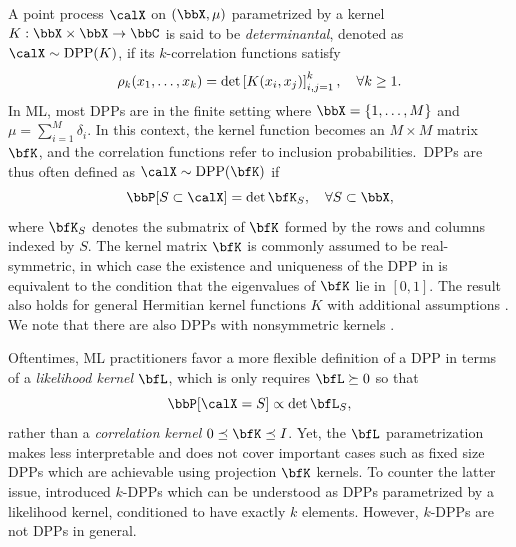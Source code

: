 \documentclass[twoside,11pt]{article}
\begin{document}

        A point process $\calX$ on $(\bbX,\mu)$ parametrized by a kernel $K:\bbX\times \bbX\rightarrow \bbC$ is said to be \emph{determinantal}, denoted as $\calX\sim\DPP(K)$, if its $k$-correlation functions satisfy
        \begin{equation*}
            \label{eq:k-correlation_function_DPP}
            \rho_k(x_1,\dots,x_k)
              = \det \left[ K(x_i, x_j) \right]_{i,j=1}^k,
            \quad \forall k\geq 1.
        \end{equation*}
        In ML, most DPPs are in the finite setting where $\bbX = \lrcb{1,\dots,M}$ and $\mu=\sum_{i=1}^M \delta_i$.
        In this context, the kernel function becomes an $M\times M$ matrix $\bfK$, and the correlation functions refer to inclusion probabilities.~DPPs are thus often defined as $\calX\sim \DPP(\bfK)$ if
        \begin{equation}
        \label{eq:inclusion_proba_finite}
            \Proba{S \subset \calX} = \det \bfK_S,
                \quad\forall S\subset \bbX,
        \end{equation}
        where ${\bfK}_S$ denotes the submatrix of $\bfK$ formed by the rows and columns indexed by $S$.
        The kernel matrix $\bfK$ is commonly assumed to be real-symmetric, in which case the existence and uniqueness of the DPP in  is equivalent to the condition that the eigenvalues of $\bfK$ lie in $[0,1]$.
        The result also holds for general Hermitian kernel functions $K$ with additional assumptions \cite[Theorem 3]{Sos00}.
        We note that there are also DPPs with nonsymmetric kernels \citep{BoDiFu10,GBDK19}.

        Oftentimes, ML practitioners favor a more flexible definition of a DPP in terms of a \emph{likelihood kernel} $\bfL$, which is only requires $\bfL\succeq 0$ so that
        \begin{equation*}
            \Proba{\calX=S}\propto \det \bfL_S,
        \end{equation*}
        rather than a \emph{correlation kernel} $0\preceq \bfK \preceq I$.
        Yet, the $\bfL$ parametrization makes  less interpretable and does not cover important cases such as fixed size DPPs which are achievable using projection $\bfK$ kernels.
        To counter the latter issue, \citet[Section 5]{KuTa12} introduced $k$-DPPs which can be understood as DPPs parametrized by a likelihood kernel, conditioned to have exactly $k$ elements.
        However, $k$-DPPs are not DPPs in general.
\end{document}
